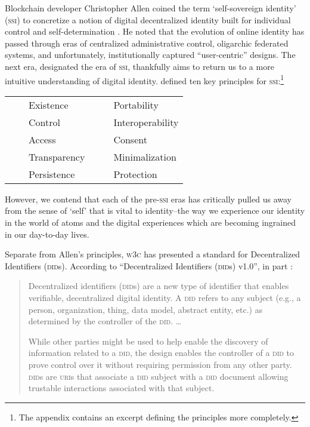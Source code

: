 \documentclass[twoside]{article}
\newcommand{\tabitem}{~~\llap{\textbullet}~~}
\begin{document}
\noindent \sloppy
Blockchain developer Christopher Allen coined the term `self-sovereign identity' (\textsc{ssi}) to concretize a notion of digital decentralized identity built for individual control and self-determination \citep{Allen2016}. He noted that the evolution of online identity has passed through eras of centralized administrative control, oligarchic federated systems, and unfortunately, institutionally captured ``user-centric'' designs. The next era, designated the era of \textsc{ssi}, thankfully aims to return us to a more intuitive understanding of digital identity. \citeauthor{Allen2016} defined ten key principles for \textsc{ssi}:\footnote{The appendix contains an excerpt defining the principles more completely.}

\begin{tabular}{ll}
  \tabitem  Existence
  &
  \tabitem  Portability \\
  \tabitem  Control
  &
  \tabitem  Interoperability \\
  \tabitem  Access
  &
  \tabitem  Consent \\
  \tabitem  Transparency
  &
  \tabitem  Minimalization \\
  \tabitem  Persistence
  &
  \tabitem  Protection \\
\end{tabular}

However, we contend that each of the pre-\textsc{ssi} eras has critically pulled us away from the sense of `self' that is vital to identity–the way we experience our identity in the world of atoms and the digital experiences which are becoming ingrained in our day-to-day lives.

Separate from Allen's principles, \textsc{w3c} has presented a standard for Decentralized Identifiers (\textsc{did}s). According to ``Decentralized Identifiers (\textsc{did}s) v1.0'', in part \citep{W3C2022}:

\begin{quote}
Decentralized identifiers (\textsc{did}s) are a new type of identifier that enables verifiable, decentralized digital identity. A \textsc{did} refers to any subject (e.g., a person, organization, thing, data model, abstract entity, etc.) as determined by the controller of the \textsc{did}.  \ldots{}

While other parties might be used to help enable the discovery of information related to a \textsc{did}, the design enables the controller of a \textsc{did} to prove control over it without requiring permission from any other party. \textsc{did}s are \textsc{uri}s that associate a \textsc{did} subject with a \textsc{did} document allowing trustable interactions associated with that subject.
\end{quote}
\end{document}
